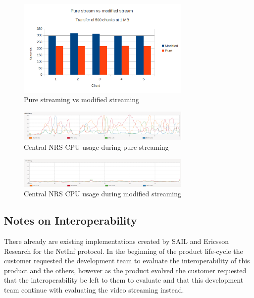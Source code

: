 \begin{figure}[h!]
	\centering
		\includegraphics[width=0.75\textwidth]{./img/eval-stream-plot-modvspure.png}
    	\caption{Pure streaming vs modified streaming}
	\label{fig:eval-stream-modvspure}
\end{figure}

\begin{figure}[h!]
	\centering
		\includegraphics[width=0.75\textwidth]{./img/eval-stream-pure-cpu.png}
    	\caption{Central NRS CPU usage during pure streaming}
	\label{fig:eval-stream-pure-cpu}
\end{figure}

\begin{figure}[h!]
	\centering
		\includegraphics[width=0.75\textwidth]{./img/eval-stream-mod-cpu.png}
    	\caption{Central NRS CPU usage during modified streaming}
	\label{fig:eval-stream-mod-cpu}
\end{figure}


\subsection{Notes on Interoperability}

There already are existing implementations created by SAIL and Ericsson Research for the NetInf protocol. In the beginning of the product life-cycle the customer requested the development team to evaluate the interoperability of this product and the others, however as the product evolved the customer requested that the interoperability be left to them to evaluate and that this development team continue with evaluating the video streaming instead.

